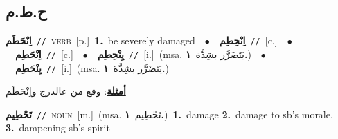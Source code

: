 \documentclass[10pt,a4paper,twoside]{article} %
\begin{document}
\begin{multicols}{2}
\vspace{-3mm}
\subsection*{\color{blue}\foreignlanguage{arabic}{ح.ط.م}\color{blue}{}} 

{\setlength\topsep{0pt}\textbf{\foreignlanguage{arabic}{اِنْحَطَم}}\ {\color{gray}\texttt{//}\color{black}}\ \textsc{verb}\ [p.]\ \textbf{1.}~be severely damaged\ \ $\bullet$\ \ \setlength\topsep{0pt}\textbf{\foreignlanguage{arabic}{اِنْحِطِم}}\ {\color{gray}\texttt{//}\color{black}}\ [c.]\ \ $\bullet$\ \ \setlength\topsep{0pt}\textbf{\foreignlanguage{arabic}{اِنْحَطِم}}\ {\color{gray}\texttt{//}\color{black}}\ [c.]\ \ $\bullet$\ \ \setlength\topsep{0pt}\textbf{\foreignlanguage{arabic}{يِنْحِطِم}}\ {\color{gray}\texttt{//}\color{black}}\ [i.]\ \color{gray}(msa. \foreignlanguage{arabic}{يَتَضَرَّر بشِدَّة}~\foreignlanguage{arabic}{\textbf{١.}})\color{black}\ \ $\bullet$\ \ \setlength\topsep{0pt}\textbf{\foreignlanguage{arabic}{يِنْحَطِم}}\ {\color{gray}\texttt{//}\color{black}}\ [i.]\ \color{gray}(msa. \foreignlanguage{arabic}{يَتَضَرَّر بشِدَّة}~\foreignlanguage{arabic}{\textbf{١.}})\color{black}\  \begin{flushright}\color{gray}\foreignlanguage{arabic}{\textbf{\underline{\foreignlanguage{arabic}{أمثلة}}}: وقع من عالدرج واِنْحَطَم}\end{flushright}\color{black}} \vspace{2mm}

{\setlength\topsep{0pt}\textbf{\foreignlanguage{arabic}{تَحْطِيم}}\ {\color{gray}\texttt{//}\color{black}}\ \textsc{noun}\ [m.]\ \color{gray}(msa. \foreignlanguage{arabic}{تَحْطِيم}~\foreignlanguage{arabic}{\textbf{١.}})\color{black}\ \textbf{1.}~damage  \textbf{2.}~damage to sb's morale.  \textbf{3.}~dampening sb's spirit\ } \vspace{2mm}


\end{multicols}
\end{document}
